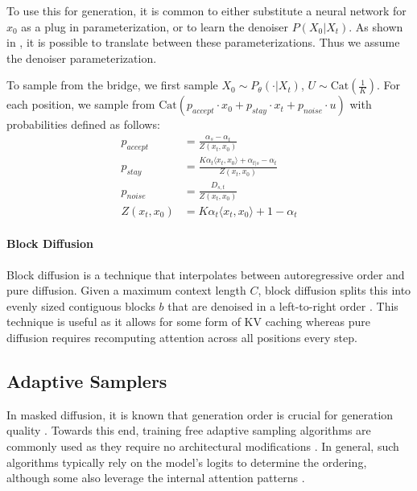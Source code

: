 To use this for generation, it is common to either substitute a neural network for $x_0$ as a plug in parameterization, or to learn the denoiser $P(X_0 | X_t)$. As shown in \citet{gourevitch2026uniform}, it is possible to translate between these parameterizations. Thus we assume the denoiser parameterization.

To sample from the bridge, we first sample $X_0 \sim P_{\theta}(\cdot | X_t)$, $U \sim \text{Cat}(\frac{1}{K})$.
For each position, we sample from $\text{Cat}(p_{accept} \cdot x_0 + p_{stay} \cdot x_t + p_{noise} \cdot u)$ with probabilities defined as follows: 
\begin{align}
\label{eq:true-rev-coords}
    p_{accept} &= \frac{\alpha_s - \alpha_t}{Z(x_t, x_0)} \\
    p_{stay} &= \frac{K\alpha_t \langle x_t, x_0 \rangle + \alpha_{t|s} - \alpha_t}{Z(x_t, x_0)} \\
    p_{noise} &= \frac{D_{s,t}}{Z(x_t, x_0)} \\
    Z(x_t, x_0) &= K \alpha_{t} \langle x_t, x_0 \rangle + 1 - \alpha_t
\end{align}

\paragraph{Block Diffusion}
Block diffusion is a technique that interpolates between autoregressive order and pure diffusion. Given a maximum context length $C$, block diffusion splits this into evenly sized contiguous blocks $b$ that are denoised in a left-to-right order \citep{arriola2025blockdiffusioninterpolatingautoregressive, deschenaux2026blockgen}. 
This technique is useful as it allows for some form of KV caching whereas pure diffusion requires recomputing attention across all positions every step.

\subsection{Adaptive Samplers}
In masked diffusion, it is known that generation order is crucial for generation quality \citep{kim2025train}.
Towards this end, training free adaptive sampling algorithms are commonly used as they require no architectural modifications \citep{nie2026large, ye2025dream7bdiffusionlarge}.
In general, such algorithms typically rely on the model's logits to determine the ordering, although some also leverage the internal attention patterns \citep{kim2026klass, wu2026fast}.

